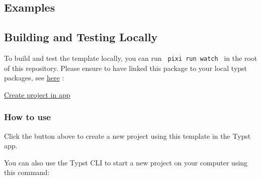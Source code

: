 \subsection{Examples}\label{examples}


\subsection{Building and Testing
Locally}\label{building-and-testing-locally}

To build and test the template locally, you can run
\texttt{\ pixi\ run\ watch\ } in the root of this repository. Please
ensure to have linked this package to your local typst packages, see
\href{https://github.com/typst/packages\#local-packages}{here} :

\begin{Shaded}
\begin{Highlighting}[]
 
  \VariableTok{$(}\VariableTok{)}

 
  \VariableTok{$(}\VariableTok{)}
\end{Highlighting}
\end{Shaded}

\href{/app?template=moderner-cv&version=0.1.0}{Create project in app}

\subsubsection{How to use}\label{how-to-use}

Click the button above to create a new project using this template in
the Typst app.

You can also use the Typst CLI to start a new project on your computer
using this command:


